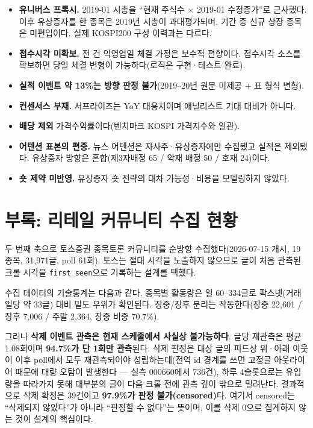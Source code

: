 \documentclass[11pt,a4paper]{article}
\newcommand{\sig}[1]{\textbf{#1}}
\begin{document}
\begin{itemize}
\item \textbf{유니버스 프록시.} 2019-01 시총을 ``현재 주식수 $\times$ 2019-01 수정종가''로 근사했다.
이후 유상증자를 한 종목은 2019년 시총이 과대평가되며, 기간 중 신규 상장 종목은 미편입이다.
실제 KOSPI200 구성 이력과는 다르다.
\item \textbf{접수시각 미확보.} 전 건 익영업일 체결 가정은 보수적 편향이다. 접수시각 소스를
확보하면 당일 체결 변형이 가능하다(로직은 구현·테스트 완료).
\item \textbf{실적 이벤트 약 13\%는 방향 판정 불가}(2019--20년 원문 미제공 + 표 형식 변형).
\item \textbf{컨센서스 부재.} 서프라이즈는 YoY 대용치이며 애널리스트 기대 대비가 아니다.
\item \textbf{배당 제외} 가격수익률이다(벤치마크 KOSPI 가격지수와 일관).
\item \textbf{어텐션 표본의 편중.} 뉴스 어텐션은 자사주·유상증자에만 수집됐고 실적은 제외됐다.
유상증자 방향은 혼합(제3자배정 65 / 악재 배정 50 / 호재 24)이다.
\item \textbf{숏 제약 미반영.} 유상증자 숏 전략의 대차 가능성·비용을 모델링하지 않았다.
\end{itemize}

\section{부록: 리테일 커뮤니티 수집 현황}

두 번째 축으로 토스증권 종목토론 커뮤니티를 순방향 수집했다(2026-07-15 개시, 19종목,
31{,}971글, poll 61회). 토스는 절대 시각을 노출하지 않으므로 글이 처음 관측된 크롤 시각을
\texttt{first\_seen}으로 기록하는 설계를 택했다.

수집 데이터의 기술통계는 다음과 같다. 종목별 활동량은 일 60--334글로 팍스넷(거래일당 약 33글)
대비 밀도 우위가 확인된다. 장중/장후 분리는 작동한다(장중 22{,}601 / 장후 7{,}006 / 주말 2{,}364,
장중 비중 70.7\%).

그러나 \sig{삭제 이벤트 관측은 현재 스케줄에서 사실상 불가능하다}. 글당 재관측은 평균 1.08회이며
\sig{94.7\%가 단 1회만 관측}된다. 삭제 판정은 대상 글의 피드상 위·아래 이웃이 이후 poll에서
모두 재관측되어야 성립하는데(전역 id 경계를 쓰면 고정글 아웃라이어 때문에 대량 오탐이 발생한다 ---
실측 000660에서 736건), 하루 4슬롯으로는 유입량을 따라가지 못해 대부분의 글이 다음 크롤 전에
관측 깊이 밖으로 밀려난다. 결과적으로 삭제 확정은 39건이고 \sig{97.9\%가 판정 불가(censored)}다.
여기서 censored는 ``삭제되지 않았다''가 아니라 ``판정할 수 없다''는 뜻이며, 이를 삭제 0으로
집계하지 않는 것이 설계의 핵심이다.
\end{document}
